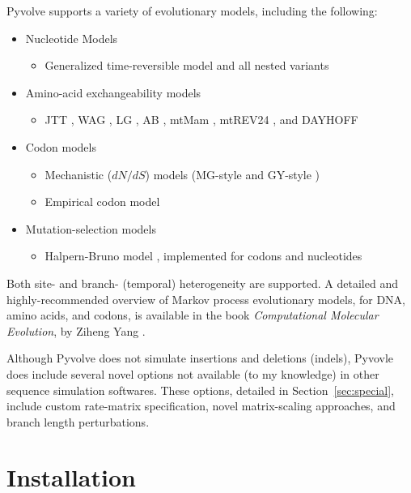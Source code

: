 \documentclass{article}
\begin{document}
\vspace*{1cm}
Pyvolve supports a variety of evolutionary models, including the following:
\begin{itemize}
	\item Nucleotide Models
	\begin{itemize}
		\item Generalized time-reversible model \cite{GTR} and all nested variants
	\end{itemize}
	\item Amino-acid exchangeability models
	\begin{itemize}
		\item JTT \cite{JTT}, WAG \cite{WAG}, LG \cite{LG}, AB \cite{ABmodel}, mtMam \cite{YangNielsenHasagawa1998}, mtREV24 \cite{mtrev24}, and DAYHOFF \cite{dayhoff}
	\end{itemize}
	\item Codon models
	\begin{itemize}
		\item Mechanistic ($dN/dS$) models (MG-style \cite{MG94} and GY-style \cite{GY94})
		\item Empirical codon model \cite{ECM}
	\end{itemize}
	\item Mutation-selection models
	\begin{itemize}
		\item Halpern-Bruno model \cite{HB98}, implemented for codons and nucleotides
	\end{itemize}
\end{itemize}
\renewcommand{\arraystretch}{1.75} %
\setlength{\parskip}{12pt}

Both site- and branch- (temporal) heterogeneity are supported. A detailed and highly-recommended overview of Markov process evolutionary models, for DNA, amino acids, and codons, is available in the book \emph{Computational Molecular Evolution}, by Ziheng Yang \citep{Yang2006}.

Although Pyvolve does not simulate insertions and deletions (indels), Pyvovle does include several novel options not available (to my knowledge) in other sequence simulation softwares. These options, detailed in Section~\ref{sec:special}, include custom rate-matrix specification, novel matrix-scaling approaches, and branch length perturbations.

\section{Installation}
\end{document}
